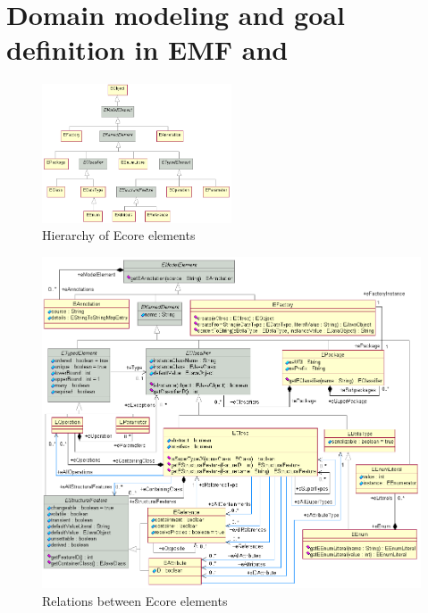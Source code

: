 \chapter{Domain modeling and goal definition in EMF and \viatra{}}


\begin{figure}[!ht]
	\begin{center}
		\includegraphics[width=0.5\textwidth]{figures/EcoreHierarchy.png}
		\caption{Hierarchy of Ecore elements}
		\label{fig:ecore-model1}
	\end{center}
\end{figure}

\begin{figure}[!ht]
	\begin{center}
		\includegraphics[width=\textwidth]{figures/EcoreRelations.png}
		\caption{Relations between Ecore elements}
		\label{fig:ecore-model2}
	\end{center}
\end{figure}

